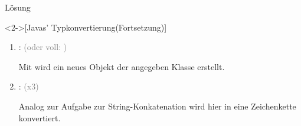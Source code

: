 \begin{frame}[c]{Lösung}
    \addtocounter{solve}{-1}%
    \begin{solve}<2->[Javas' Typkonvertierung\hfill(Fortsetzung)]
\pause\begin{enumerate}[<+(1)->]
    \widei
    \setcounter{enumi}{6}
    \item {}:  \textcolor{gray}{(oder voll: )}\pause\par
    Mit  wird ein neues Objekt der angegeben Klasse erstellt.
    \item {}:  \textcolor{gray}{(x3)}\pause\par
    Analog zur Aufgabe zur String-Konkatenation wird hier  in eine Zeichenkette konvertiert.
\end{enumerate}
    \end{solve}
\end{frame}
\fi
